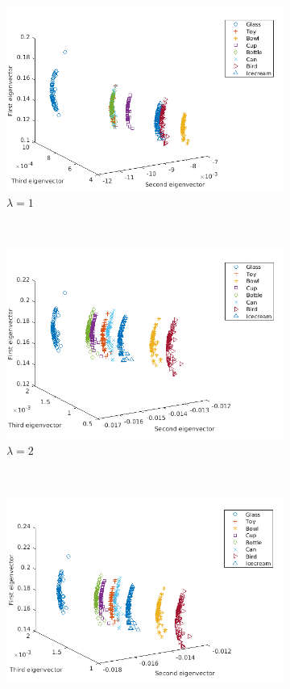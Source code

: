 \documentclass[10pt,a4paper]{article}
\begin{document}
\begin{figure}[H]
	\centering
	\begin{subfigure}[b]{0.5\textwidth}
		\includegraphics[width= \textwidth]{images/Zeta-Laplace1.png}
		\caption{$\lambda=1$}
		\label{}
	\end{subfigure}~
	\begin{subfigure}[b]{0.5\textwidth}
		\includegraphics[width= \textwidth]{images/Zeta-Laplace2.png}
		\caption{$\lambda=2$}
		\label{}
	\end{subfigure}\\
	\begin{subfigure}[b]{0.5\textwidth}
		\includegraphics[width= \textwidth]{images/Zeta-Laplace4.png}

\end{subfigure}
\end{figure}
\end{document}
